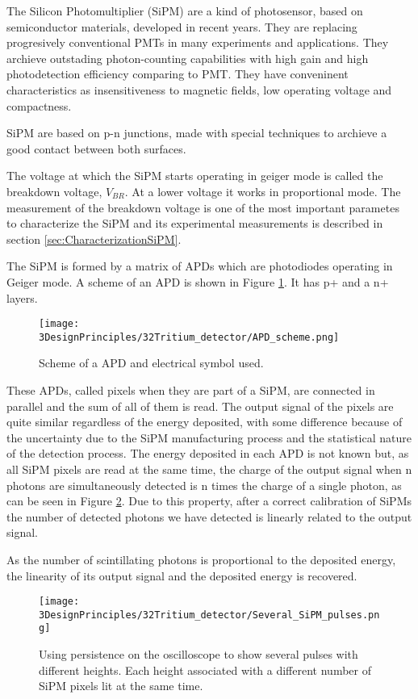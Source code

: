The Silicon Photomultiplier (SiPM) are a kind of photosensor, based on semiconductor materials, developed in recent years. They are replacing progresively conventional PMTs in many experiments and applications. They archieve outstading photon-counting capabilities with high gain and high photodetection efficiency comparing to PMT. They have conveninent characteristics as insensitiveness to magnetic fields, low operating voltage and compactness.

SiPM are based on p-n junctions, made with special techniques to archieve a good contact between both surfaces.

The voltage at which the SiPM starts operating in geiger mode is called the breakdown voltage, $ V_ {BR} $. At a lower voltage it works in proportional mode. The measurement of the breakdown voltage is one of the most important parametes to characterize the SiPM and its experimental measurements is described in section \ref{sec:CharacterizationSiPM}.

The SiPM is formed by a matrix of APDs which are photodiodes operating in Geiger mode. A scheme of an APD is shown in Figure \ref{fig:SchemeAPD}. It has p+ and a n+ layers. 

\begin{figure}[htbp]
\centering
\texttt{[image: 3DesignPrinciples/32Tritium\_detector/APD\_scheme.png]}
\caption{Scheme of a APD and electrical symbol used.\label{fig:SchemeAPD}~\cite{OSI}}
\end{figure}
 
These APDs, called pixels when they are part of a SiPM, are connected in parallel and the sum of all of them is read. The output signal of the pixels are quite similar regardless of the energy deposited, with some difference because of the uncertainty due to the SiPM manufacturing process and the statistical nature of the detection process. The energy deposited in each APD is not known but, as all SiPM pixels are read at the same time, the charge of the output signal when n photons are simultaneously detected is n times the charge of a single photon, as can be seen in Figure \ref{fig:PulsesOfSiPM}. Due to this property, after a correct calibration of SiPMs the number of detected photons we have detected is linearly related to the output signal. 

As the number of scintillating photons is proportional to the deposited energy, the linearity of its output signal and the deposited energy is recovered.

\begin{figure}[htbp]
\centering
\texttt{[image: 3DesignPrinciples/32Tritium\_detector/Several\_SiPM\_pulses.png]}
\caption{Using persistence on the oscilloscope to show several pulses with different heights. Each height associated with a different number of  SiPM pixels lit at the same time.\label{fig:PulsesOfSiPM}}
\end{figure}

